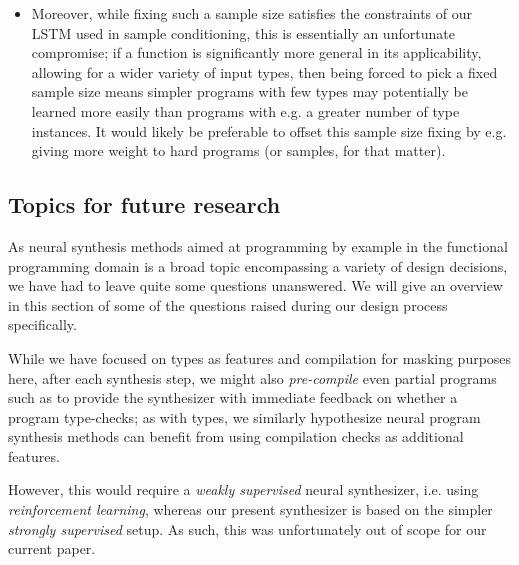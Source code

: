 \documentclass{article}
\begin{document}
\begin{itemize}
    \item
    Moreover, while fixing such a sample size satisfies the constraints of our LSTM used in sample conditioning,
    this is essentially an unfortunate compromise;
    if a function is significantly more general in its applicability,
    allowing for a wider variety of input types,
    then being forced to pick a fixed sample size means simpler programs with few types may potentially be learned more easily than programs with e.g. a greater number of type instances.
    It would likely be preferable to offset this sample size fixing by e.g. giving more weight to hard programs (or samples, for that matter).

\end{itemize}

\subsection{Topics for future research}

As neural synthesis methods aimed at programming by example in the functional
programming domain is a broad topic encompassing a variety of design decisions,
we have had to leave quite some questions unanswered.
We will give an overview in this section of some of the questions raised during our design process specifically.

    While we have focused on types as features and compilation for masking purposes here,
    after each synthesis step,
    we might also \emph{pre-compile} even partial programs such as to provide the synthesizer with immediate feedback on whether a program type-checks;
    as with types, we similarly hypothesize neural program synthesis methods can benefit from using compilation checks as additional features.

    However, this would require a \emph{weakly supervised} neural synthesizer,
    i.e. using \emph{reinforcement learning},
    whereas our present synthesizer is based on the simpler \emph{strongly supervised} setup.
    As such, this was unfortunately out of scope for our current paper.

\end{document}
